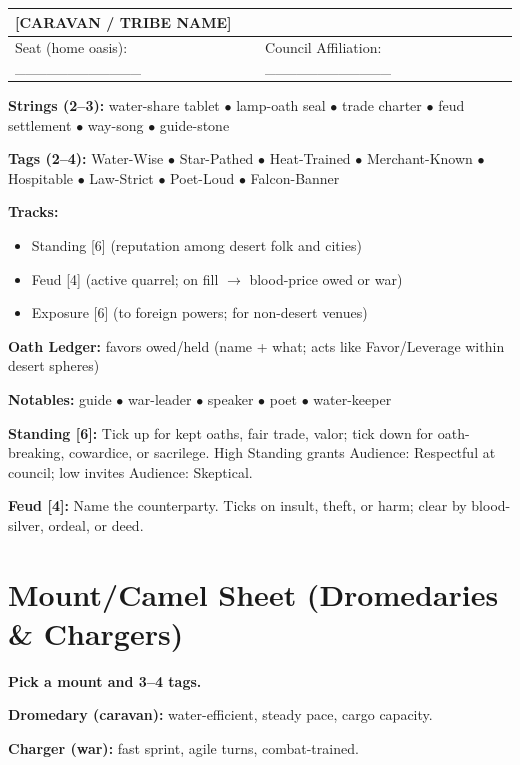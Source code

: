 \documentclass[11pt]{article}
\begin{document}
\begin{center}
\begin{longtable}{|p{5cm}|p{5cm}|}
\hline
\textbf{[CARAVAN / TRIBE NAME]} & \\
\hline
Seat (home oasis): \_\_\_\_\_\_\_\_\_\_\_\_ & Council Affiliation: \_\_\_\_\_\_\_\_\_\_\_\_ \\
\hline
\end{longtable}
\end{center}

\textbf{Strings (2--3):} water-share tablet $\bullet$ lamp-oath seal $\bullet$ trade charter $\bullet$ feud settlement $\bullet$ way-song $\bullet$ guide-stone

\textbf{Tags (2--4):} Water-Wise $\bullet$ Star-Pathed $\bullet$ Heat-Trained $\bullet$ Merchant-Known $\bullet$ Hospitable $\bullet$ Law-Strict $\bullet$ Poet-Loud $\bullet$ Falcon-Banner

\textbf{Tracks:}
\begin{itemize}
\item Standing [6] (reputation among desert folk and cities)
\item Feud [4] (active quarrel; on fill $\rightarrow$ blood-price owed or war)
\item Exposure [6] (to foreign powers; for non-desert venues)
\end{itemize}

\textbf{Oath Ledger:} favors owed/held (name + what; acts like Favor/Leverage within desert spheres)

\textbf{Notables:} guide $\bullet$ war-leader $\bullet$ speaker $\bullet$ poet $\bullet$ water-keeper

\textbf{Standing [6]:} Tick up for kept oaths, fair trade, valor; tick down for oath-breaking, cowardice, or sacrilege. High Standing grants Audience: Respectful at council; low invites Audience: Skeptical.

\textbf{Feud [4]:} Name the counterparty. Ticks on insult, theft, or harm; clear by blood-silver, ordeal, or deed.

\section{Mount/Camel Sheet (Dromedaries \& Chargers)}

\textbf{Pick a mount and 3--4 tags.}

\textbf{Dromedary (caravan):} water-efficient, steady pace, cargo capacity.

\textbf{Charger (war):} fast sprint, agile turns, combat-trained.
\end{document}

